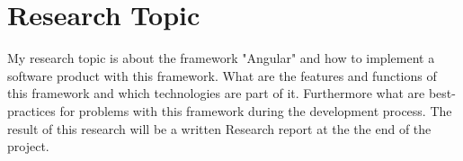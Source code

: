 \section{Research Topic}
\label{sec:research}
My research topic is about the framework "Angular" and how to implement a software product with this framework. What are the features and functions of this framework and which technologies are part of it. Furthermore what are best-practices for problems with this framework during the development process. The result of this research will be a written Research report at the the end of the project.
